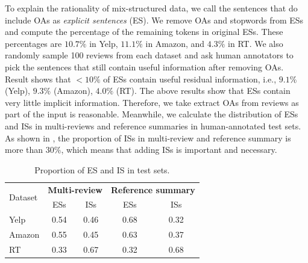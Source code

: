 To explain the rationality of mix-structured data, we call the sentences that do include OAs as \textit{explicit sentences} (ES).
We remove OAs and stopwords from ESs and compute the percentage of the remaining tokens 
in original ESs. These percentages are $10.7\%$ in Yelp, $11.1\%$ in Amazon, and $4.3\%$ in RT.
We also randomly sample 100 reviews from each dataset and ask human annotators to pick the
sentences that still contain useful information after removing OAs.
Result shows that $<10\%$ of ESs contain useful residual information, i.e., $9.1\%$ (Yelp), $9.3\%$ (Amazon), $4.0\%$ (RT).
The above results show that ESs contain very little implicit information.
Therefore, we take extract OAs from reviews as part of the input is reasonable.
Meanwhile, we calculate the distribution of ESs and ISs in multi-reviews and reference summaries in human-annotated test sets.
As shown in , the proportion of ISs in multi-review and reference summary is more than $30\%$, which means that
adding ISs is important and necessary.
\begin{table}[th]
	\scriptsize
	\centering
	\begin{tabular}{|l|cc|cc|}
		\hline
		\multirow{2}{*}{Dataset}&\multicolumn{2}{c|}{\textbf{Multi-review}}&\multicolumn{2}{c|}{\textbf{Reference summary}} \\ \cline{2-5}
		&ESs & ISs & ESs & ISs \\
		\hline
		Yelp & 0.54& 0.46&0.68 &0.32\\
		Amazon &  0.55&0.45&0.63&0.37\\
		RT &  0.33&0.67&0.32&0.68\\
		\hline
	\end{tabular}
	\caption{Proportion of ES and IS in test sets.}
	\label{tab:OAIS}
\end{table}


